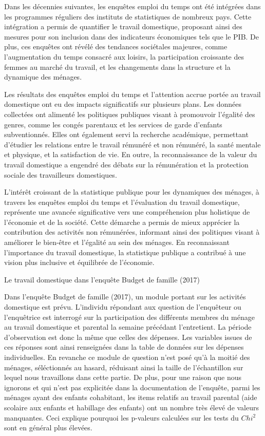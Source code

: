 \documentclass[
  12pt,
]{book}
\begin{document}
Dans les décennies suivantes, les enquêtes emploi du temps ont été
intégrées dans les programmes réguliers des instituts de statistiques de
nombreux pays. Cette intégration a permis de quantifier le travail
domestique, proposant ainsi des mesures pour son inclusion dans des
indicateurs économiques tels que le PIB. De plus, ces enquêtes ont
révélé des tendances sociétales majeures, comme l'augmentation du temps
consacré aux loisirs, la participation croissante des femmes au marché
du travail, et les changements dans la structure et la dynamique des
ménages.

Les résultats des enquêtes emploi du temps et l'attention accrue portée
au travail domestique ont eu des impacts significatifs sur plusieurs
plans. Les données collectées ont alimenté les politiques publiques
visant à promouvoir l'égalité des genres, comme les congés parentaux et
les services de garde d'enfants subventionnés. Elles ont également servi
la recherche académique, permettant d'étudier les relations entre le
travail rémunéré et non rémunéré, la santé mentale et physique, et la
satisfaction de vie. En outre, la reconnaissance de la valeur du travail
domestique a engendré des débats sur la rémunération et la protection
sociale des travailleurs domestiques.

L'intérêt croissant de la statistique publique pour les dynamiques des
ménages, à travers les enquêtes emploi du temps et l'évaluation du
travail domestique, représente une avancée significative vers une
compréhension plus holistique de l'économie et de la société. Cette
démarche a permis de mieux apprécier la contribution des activités non
rémunérées, informant ainsi des politiques visant à améliorer le
bien-être et l'égalité au sein des ménages. En reconnaissant
l'importance du travail domestique, la statistique publique a contribué
à une vision plus inclusive et équilibrée de l'économie.

\begin{encadre}{Le travail domestique dans l'enquête Budget de famille (2017)}


Dans l'enquête Budget de famille (2017), un module portant sur les activités domestique est prévu. L'individu répondant aux question de l'enquêteur ou l'enquêtrice est interrogé sur la participation des différents membres du ménage au travail domestique et parental la semaine précédant l'entretient. La période d’observation est donc la même que celles des dépenses. Les variables issues de ces réponses sont ainsi renseignées dans la table de données sur les dépenses individuelles. En revanche ce module de question n'est posé qu'à la moitié des ménages, séléctionnés au hasard, réduisant ainsi la taille de l’échantillon sur lequel nous travaillons dans cette partie. De plus, pour une raison que nous ignorons et qui n'est pas explicitée dans la documentation de l'enquête, parmi les ménages ayant des enfants cohabitant, les items relatifs au travail parental (aide scolaire aux enfants et habillage des enfants) ont un nombre très élevé de valeurs manquantes. Ceci explique pourquoi les p-valeurs calculées sur les tests du $Chi^2$ sont en général plus élevées. 

\end{encadre}
\end{document}
